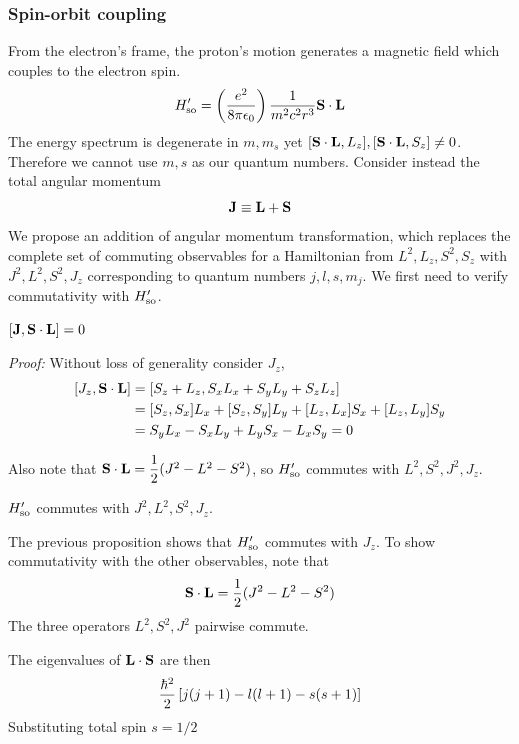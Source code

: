 \subsubsection{Spin-orbit coupling}
From the electron's frame, the proton's motion generates a magnetic field which 
couples to the electron spin. 
\begin{equation}\label{eqn:spin_orbit_coupling}
    H'_{\mathrm{so}} = \left(\dfrac{e^2}{8\pi \epsilon_0}\right)\dfrac 1 {m^2c^2r^3}\bf{S\cdot L}
\end{equation}
The energy spectrum is degenerate in $m, m_s$ yet 
${[\mathbf S\cdot \mathbf L, L_z], [\mathbf{S\cdot L}, S_z]}\neq 0$. 
Therefore we cannot use $m, s$ as 
our quantum numbers. Consider instead the total angular momentum 
\begin{equation}\label{def:J}
    \bf{J\equiv L + S}
\end{equation}
We propose an addition of angular momentum transformation, which 
replaces the complete set of commuting observables for a Hamiltonian 
from $L^2, L_z, S^2, S_z$ with $J^2, L^2, S^2, J_z$ corresponding to 
quantum numbers $j, l, s, m_j$. We first need to 
verify commutativity with $H'_{\mathrm{so}}$. 
\begin{proposition}
    $[\mathbf J, \mathbf{S\cdot L}] = 0$

    \textit{Proof:} Without loss of generality consider $J_z$, 
    \[\begin{aligned} 
        [J_z, \mbf{S\cdot L}] 
            &= [S_z+L_z, S_xL_x+S_yL_y+S_zL_z] \\ 
            &= [S_z, S_x]L_x + [S_z, S_y]L_y + [L_z, L_x]S_x + [L_z, L_y]S_y \\ 
            &= S_yL_x - S_xL_y + L_yS_x - L_xS_y = 0
    \end{aligned}\]
\end{proposition}
Also note that $\mathbf{S\cdot L} = \dfrac 1 2 (J^2 - L^2 - S^2)$, 
so $H'_{\mathrm{so}}$ commutes with $L^2, S^2, J^2, J_z$. 
\begin{proposition}
    $H'_{\mathrm{so}}$ commutes with $J^2, L^2, S^2, J_z$. 

    \prf The previous proposition shows that $H'_{\mathrm{so}}$ commutes with $J_z$. 
    To show commutativity with the other observables, note that 
    \[ 
        \mathbf{S\cdot L} = \dfrac 1 2 (J^2 - L^2 - S^2)
    \] 
    The three operators $L^2, S^2, J^2$ pairwise commute. 
\end{proposition}
The eigenvalues of $\mathbf{L\cdot S}$ are then
\[ 
    \dfrac{\hbar^2}2\left[j(j+1)-l(l+1)-s(s+1)\right]
\]
Substituting total spin $s=1/2$ 

